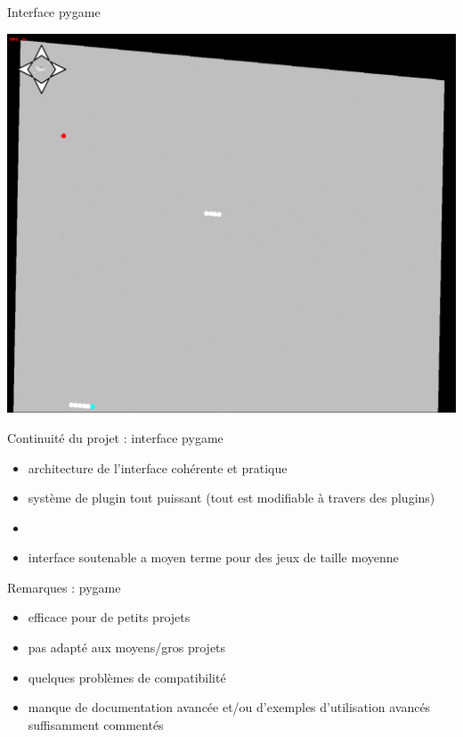 \documentclass[11pt]{beamer}
\begin{document}
\begin{frame}{Interface pygame}
	\begin{center}\includegraphics[scale=0.2]{game_screenshot.png}\end{center}
\end{frame}

\begin{frame}{Continuité du projet : interface pygame}
	\begin{itemize}
		\item architecture de l'interface cohérente et pratique
		\item système de plugin tout puissant (tout est modifiable à travers des plugins)
		\item[]
		\item interface soutenable a moyen terme pour des jeux de taille moyenne
	\end{itemize}
\end{frame}

\begin{frame}{Remarques : pygame}
	\begin{itemize}
		\item efficace pour de petits projets
		\item pas adapté aux moyens/gros projets
		\item quelques problèmes de compatibilité
		\item manque de documentation avancée et/ou d'exemples d'utilisation avancés suffisamment commentés
	\end{itemize}
\end{frame}
\end{document}
